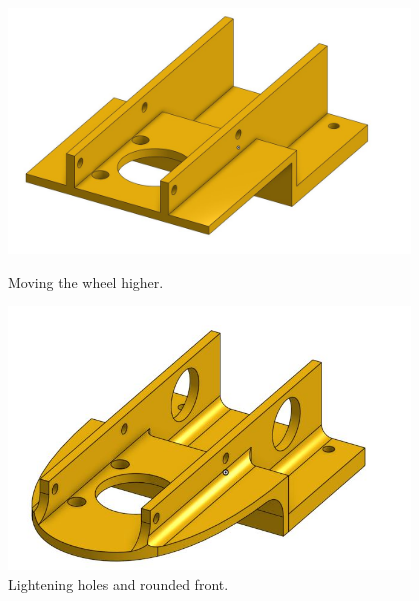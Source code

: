 \begin{figure}[ht]
\centering
\begin{minipage}[b]{.48\textwidth}
  \centering
  \includegraphics[width=0.95\textwidth]{Meetings/October/10-21-21/10-21-21_CAD_Figure1 - Nathan Forrer.JPG}
  \caption{Moving the wheel higher.}
  \label{fig:102121_1}
\end{minipage}%
\hfill%
\begin{minipage}[b]{.48\textwidth}
  \centering
  \includegraphics[width=0.95\textwidth]{Meetings/October/10-21-21/10-21-21_CAD_Figure2 - Nathan Forrer.JPG}
  \caption{Lightening holes and rounded front.}
  \label{fig:102121_2}
\end{minipage}
\end{figure}


